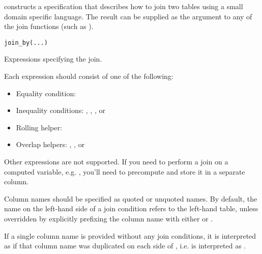 \documentclass[a4paper]{book}
\begin{document}
%
\begin{Description}
 constructs a specification that describes how to join two tables
using a small domain specific language. The result can be supplied as the
 argument to any of the join functions (such as ).
\end{Description}
%
\begin{Usage}
\begin{verbatim}
join_by(...)
\end{verbatim}
\end{Usage}
%
\begin{Arguments}
\begin{ldescription}
\item[\code{...}] Expressions specifying the join.

Each expression should consist of one of the following:
\begin{itemize}

\item{} Equality condition: \code{==}
\item{} Inequality conditions: \code{>=}, \code{>}, \code{<=}, or \code{<}
\item{} Rolling helper: 
\item{} Overlap helpers: , , or 

\end{itemize}


Other expressions are not supported. If you need to perform a join on
a computed variable, e.g. ,
you'll need to precompute and store it in a separate column.

Column names should be specified as quoted or unquoted names. By default,
the name on the left-hand side of a join condition refers to the left-hand
table, unless overridden by explicitly prefixing the column name with
either  or .

If a single column name is provided without any join conditions, it is
interpreted as if that column name was duplicated on each side of \code{==},
i.e.  is interpreted as .
\end{ldescription}
\end{Arguments}
%
\end{document}
